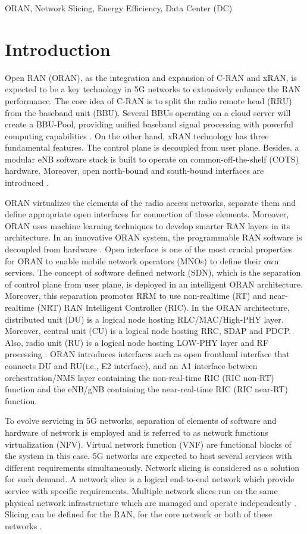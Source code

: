 \documentclass[conference]{IEEEtran}
\begin{document}
\begin{IEEEkeywords}
ORAN, Network Slicing, Energy Efficiency, Data Center (DC)
\end{IEEEkeywords}

\section{Introduction}
Open RAN (ORAN), as the integration and expansion of C-RAN and xRAN, is expected to be a key technology in 5G networks to extensively enhance the RAN performance. The core idea of C-RAN is to split the radio remote head (RRU) from the baseband unit (BBU). Several BBUs operating on a cloud server will create a BBU-Pool, providing unified baseband signal processing with powerful computing capabilities \cite{cran1,frdl,simeone2016cloud,motalleb2017optimal}. On the other hand, xRAN technology has three fundamental features. The control plane is decoupled from user plane. Besides, a modular eNB software stack is built to operate on common-off-the-shelf (COTS) hardware. Moreover, open north-bound and south-bound interfaces are introduced \cite{xran}.

ORAN virtualizes the elements of the radio access networks, separate them and define appropriate open interfaces for connection of these elements. Moreover, ORAN uses machine learning techniques to develop smarter RAN layers in its architecture. In an innovative ORAN system, the programmable RAN software is decoupled from hardware \cite{oran1}. Open interface is one of the most crucial properties for ORAN to enable mobile network operators (MNOs) to define their own services.
The concept of software defined network (SDN), which is the separation of control plane from user plane, is deployed in an intelligent ORAN architecture. Moreover, this separation promotes RRM to use non-realtime (RT) and near-realtime (NRT) RAN Intelligent Controller (RIC).
In the ORAN architecture, distributed unit (DU) is a logical node hosting RLC/MAC/High-PHY layer.
Moreover, central unit (CU) is a logical node hosting RRC, SDAP and PDCP. Also, radio unit (RU)  is a logical node hosting LOW-PHY layer and
RF processing \cite{oranpaper}.
ORAN introduces interfaces such as open fronthaul interface that connects DU and RU(i.e., E2 interface), and an A1 interface between orchestration/NMS layer containing the non-real-time RIC (RIC non-RT) function and the eNB/gNB containing the near-real-time RIC (RIC near-RT) function.

To evolve servicing in 5G networks, separation of elements of software and hardware of network is employed and is referred to as network functions virtualization (NFV). Virtual network function (VNF) are functional blocks of the system in this case. 5G networks are expected to host several services with different requirements simultaneously. Network slicing is considered as a solution for such demand. A network slice is a logical end-to-end network which provide service with specific requirements. Multiple network slices run on the same physical network infrastructure which are managed and operate independently \cite{lee2018dynamic}. Slicing can be defined for the RAN, for the core network or both of these networks \cite{ns1}.
\end{document}
